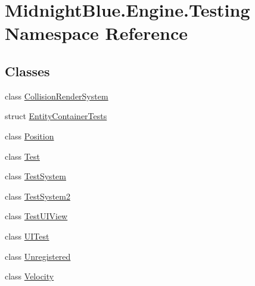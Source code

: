 \hypertarget{namespace_midnight_blue_1_1_engine_1_1_testing}{}\section{Midnight\+Blue.\+Engine.\+Testing Namespace Reference}
\label{namespace_midnight_blue_1_1_engine_1_1_testing}
\subsection*{Classes}
\begin{DoxyCompactItemize}
\item 
class \hyperlink{class_midnight_blue_1_1_engine_1_1_testing_1_1_collision_render_system}{Collision\+Render\+System}
\item 
struct \hyperlink{struct_midnight_blue_1_1_engine_1_1_testing_1_1_entity_container_tests}{Entity\+Container\+Tests}
\item 
class \hyperlink{class_midnight_blue_1_1_engine_1_1_testing_1_1_position}{Position}
\item 
class \hyperlink{class_midnight_blue_1_1_engine_1_1_testing_1_1_test}{Test}
\item 
class \hyperlink{class_midnight_blue_1_1_engine_1_1_testing_1_1_test_system}{Test\+System}
\item 
class \hyperlink{class_midnight_blue_1_1_engine_1_1_testing_1_1_test_system2}{Test\+System2}
\item 
class \hyperlink{class_midnight_blue_1_1_engine_1_1_testing_1_1_test_u_i_view}{Test\+U\+I\+View}
\item 
class \hyperlink{class_midnight_blue_1_1_engine_1_1_testing_1_1_u_i_test}{U\+I\+Test}
\item 
class \hyperlink{class_midnight_blue_1_1_engine_1_1_testing_1_1_unregistered}{Unregistered}
\item 
class \hyperlink{class_midnight_blue_1_1_engine_1_1_testing_1_1_velocity}{Velocity}
\end{DoxyCompactItemize}

